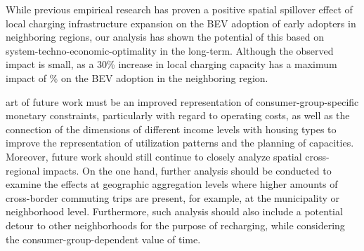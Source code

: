 \documentclass[preprint,review,11pt, authoryear]{elsarticle}
\begin{document}
    While previous empirical research has proven a positive spatial spill\deleted{-}over effect of local charging infrastructure expansion on the BEV adoption of early adopters in neighboring regions, our analysis has shown the potential of this based on system-techno-economic-optimality in the long-term. Although the observed impact is small, as a 30\% increase in local charging capacity has a maximum impact of \% on the BEV adoption in the neighboring region. 

      art of future work must be an improved representation of consumer-group-specific monetary constraints, particularly with regard to operating costs, as well as the connection of the dimensions of different income levels with housing types to improve the representation of utilization patterns and the planning of capacities.  Moreover, future work should still continue to closely analyze spatial cross-regional impacts. On the one hand, further analysis should be conducted to examine the effects at geographic aggregation levels where higher amounts of cross-border commuting trips are present, for example, at the municipality or neighborhood level.  Furthermore, such analysis should also include a potential detour to other neighborhoods for the purpose of recharging, while considering the consumer-group-dependent value of time.
    


\end{document}
